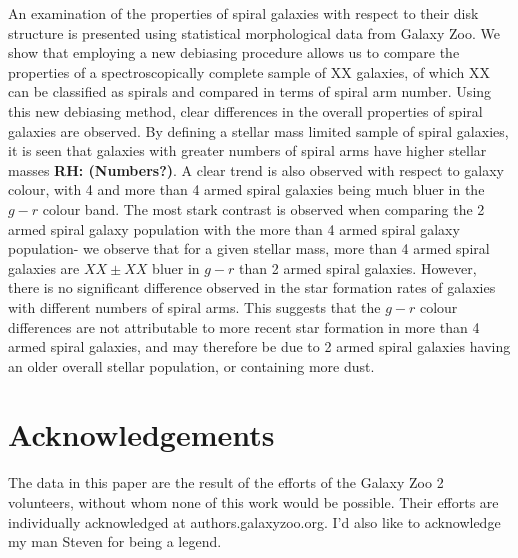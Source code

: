 \documentclass[useAMS,usenatbib]{mn2e}
\newcommand{\rh}[1]{{\bf \textcolor{RoyalPurple}{RH: #1}}}
\begin{document}
An examination of the properties of spiral galaxies with respect to their disk structure is presented using statistical morphological data from Galaxy Zoo. We show that employing a new debiasing procedure allows us to compare the properties of a spectroscopically complete sample of XX galaxies, of which XX can be classified as spirals and compared in terms of spiral arm number. Using this new debiasing method, clear differences in the overall properties of spiral galaxies are observed. By defining a stellar mass limited sample of spiral galaxies, it is seen that galaxies with greater numbers of spiral arms have higher stellar masses \rh{(Numbers?)}. A clear trend is also observed with respect to galaxy colour, with 4 and more than 4 armed spiral galaxies being much bluer in the $g-r$ colour band. The most stark contrast is observed when comparing the 2 armed spiral galaxy population with the more than 4 armed spiral galaxy population- we observe that for a given stellar mass, more than 4 armed spiral galaxies are $XX \pm XX$ bluer in $g-r$ than 2 armed spiral galaxies. However, there is no significant difference observed in the star formation rates of galaxies with different numbers of spiral arms. This suggests  that the $g-r$ colour differences are not attributable to more recent star formation in more than 4 armed spiral galaxies, and may therefore be due to 2 armed spiral galaxies having an older overall stellar population, or containing more dust.  


\section{Acknowledgements}

The data in this paper are the result of the efforts of the Galaxy Zoo 2 volunteers, without whom none of this work would be possible. Their efforts are individually acknowledged at authors.galaxyzoo.org. I'd also like to acknowledge my man Steven for being a legend.




\end{document}
